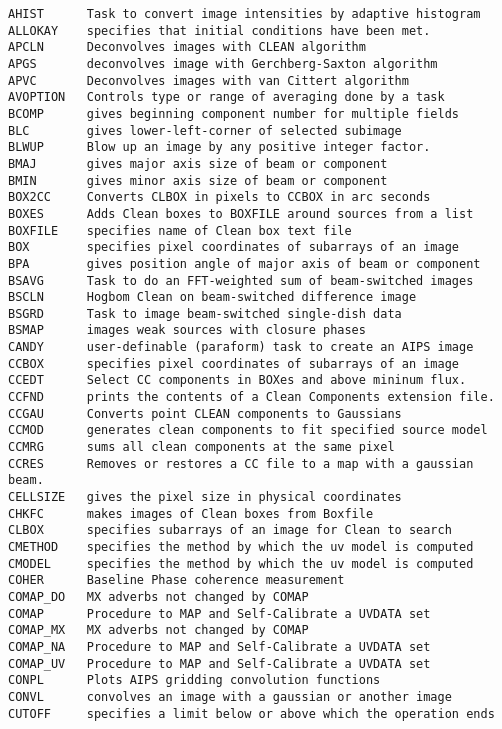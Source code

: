 \vskip 0.5pt
\bbve\begin{verbatim}
AHIST      Task to convert image intensities by adaptive histogram
ALLOKAY    specifies that initial conditions have been met.
APCLN      Deconvolves images with CLEAN algorithm
APGS       deconvolves image with Gerchberg-Saxton algorithm
APVC       Deconvolves images with van Cittert algorithm
AVOPTION   Controls type or range of averaging done by a task
BCOMP      gives beginning component number for multiple fields
BLC        gives lower-left-corner of selected subimage
BLWUP      Blow up an image by any positive integer factor.
BMAJ       gives major axis size of beam or component
BMIN       gives minor axis size of beam or component
BOX2CC     Converts CLBOX in pixels to CCBOX in arc seconds
BOXES      Adds Clean boxes to BOXFILE around sources from a list
BOXFILE    specifies name of Clean box text file
BOX        specifies pixel coordinates of subarrays of an image
BPA        gives position angle of major axis of beam or component
BSAVG      Task to do an FFT-weighted sum of beam-switched images
BSCLN      Hogbom Clean on beam-switched difference image
BSGRD      Task to image beam-switched single-dish data
BSMAP      images weak sources with closure phases
CANDY      user-definable (paraform) task to create an AIPS image
CCBOX      specifies pixel coordinates of subarrays of an image
CCEDT      Select CC components in BOXes and above mininum flux.
CCFND      prints the contents of a Clean Components extension file.
CCGAU      Converts point CLEAN components to Gaussians
CCMOD      generates clean components to fit specified source model
CCMRG      sums all clean components at the same pixel
CCRES      Removes or restores a CC file to a map with a gaussian beam.
CELLSIZE   gives the pixel size in physical coordinates
CHKFC      makes images of Clean boxes from Boxfile
CLBOX      specifies subarrays of an image for Clean to search
CMETHOD    specifies the method by which the uv model is computed
CMODEL     specifies the method by which the uv model is computed
COHER      Baseline Phase coherence measurement
COMAP_DO   MX adverbs not changed by COMAP
COMAP      Procedure to MAP and Self-Calibrate a UVDATA set
COMAP_MX   MX adverbs not changed by COMAP
COMAP_NA   Procedure to MAP and Self-Calibrate a UVDATA set
COMAP_UV   Procedure to MAP and Self-Calibrate a UVDATA set
CONPL      Plots AIPS gridding convolution functions
CONVL      convolves an image with a gaussian or another image
CUTOFF     specifies a limit below or above which the operation ends

\end{verbatim}
